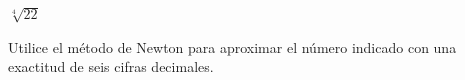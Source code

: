 \setcounter{enumi}{4}
\item $\sqrt[4]{22}$
\par
Utilice el método de Newton para aproximar el número indicado con una exactitud de seis cifras decimales.

